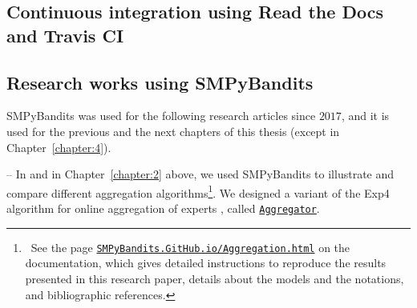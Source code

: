 \subsection{Continuous integration using Read the Docs and Travis CI}



\subsection{Research works using SMPyBandits}

SMPyBandits was used for the following research articles since $2017$, and it is used for the previous and the next chapters of this thesis (except in Chapter~\ref{chapter:4}).

-- In \cite{Besson2018WCNC} and in Chapter~\ref{chapter:2} above, we used SMPyBandits to illustrate and compare different aggregation algorithms\footnote{~See the page \texttt{\href{https://SMPyBandits.GitHub.io/Aggregation.html}{SMPyBandits.GitHub.io/Aggregation.html}} on the documentation, which gives detailed instructions to reproduce the results presented in this research paper, details about the models and the notations, and bibliographic references.}. We designed a variant of the Exp4 algorithm for online aggregation of experts \cite{Bubeck12}, called \texttt{\href{https://SMPyBandits.GitHub.io/docs/Policies.Aggregator.html}{Aggregator}}.

